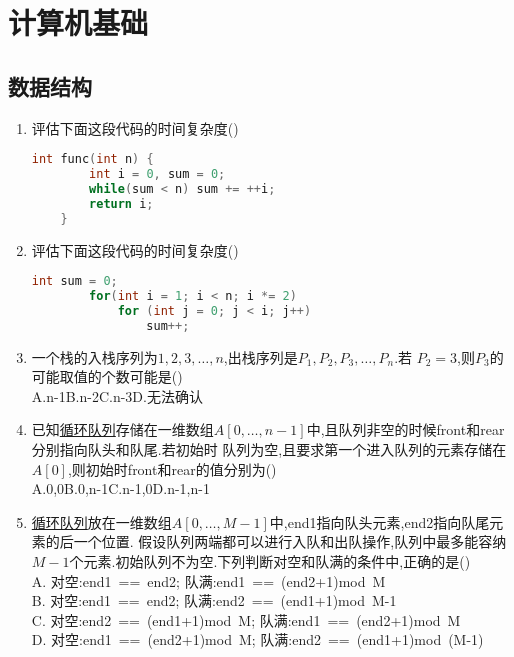 \documentclass[12pt, a4paper, oneside, UTF8]{ctexbook}
\begin{document}
% 
\else
\fi
\chapter{计算机基础}
\section{数据结构}
\begin{enumerate}
    \item  评估下面这段代码的时间复杂度()
\begin{lstlisting}[language=C]
    int func(int n) {
        int i = 0, sum = 0;
        while(sum < n) sum += ++i;
        return i;
    }
\end{lstlisting}

    \item 评估下面这段代码的时间复杂度()
\begin{lstlisting}[language=C]
    int sum = 0;
        for(int i = 1; i < n; i *= 2)
            for (int j = 0; j < i; j++)
                sum++;
\end{lstlisting}

    \item 一个栈的入栈序列为\underline{$1,2,3,\ldots,n$},出栈序列是\underline{$P_1,P_2,P_3,\ldots,P_n$}.若
    $P_2=3$,则$P_3$的可能取值的个数可能是() \\
    A.n-1\qquad B.n-2\qquad C.n-3\qquad D.无法确认 

    \item 已知\underline{循环队列}存储在一维数组$A[0,\ldots,n-1]$中,且队列非空的时候front和rear分别指向队头和队尾.若初始时
    队列为空,且要求第一个进入队列的元素存储在$A[0]$,则初始时front和rear的值分别为() \\
    A.0,0\qquad\qquad B.0,n-1\qquad\qquad C.n-1,0\qquad\qquad D.n-1,n-1

    \item \underline{循环队列}放在一维数组$A[0,\ldots,M-1]$中,end1指向队头元素,end2指向队尾元素的后一个位置.
    假设队列两端都可以进行入队和出队操作,队列中最多能容纳$M-1$个元素.初始队列不为空.下列判断对空和队满的条件中,正确的是() \\
    A. 对空:end1\ ==\ end2; \qquad\qquad\qquad\qquad\quad 队满:end1\ ==\ (end2+1)mod\ M\\
    B. 对空:end1\ ==\ end2; \qquad\qquad\qquad\qquad\quad 队满:end2\ ==\ (end1+1)mod\ M-1\\
    C. 对空:end2\ ==\ (end1+1)mod\ M; \qquad\qquad 队满:end1\ ==\ (end2+1)mod\ M\\
    D. 对空:end1\ ==\ (end2+1)mod\ M; \qquad\qquad 队满:end2\ ==\ (end1+1)mod\ (M-1)
    

\end{enumerate}
\end{document}
